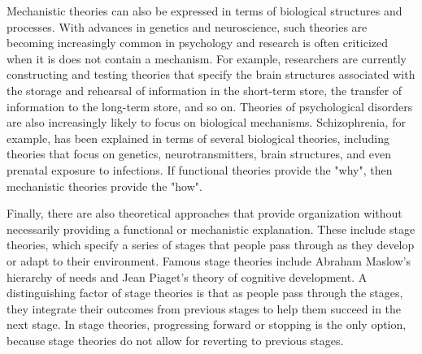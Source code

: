 Mechanistic theories can also be expressed in terms of biological structures and processes. With advances in genetics and neuroscience, such theories are becoming increasingly common in psychology and research is often criticized when it is does not contain a mechanism. For example, researchers are currently constructing and testing theories that specify the brain structures associated with the storage and rehearsal of information in the short-term store, the transfer of information to the long-term store, and so on. Theories of psychological disorders are also increasingly likely to focus on biological mechanisms. Schizophrenia, for example, has been explained in terms of several biological theories, including theories that focus on genetics, neurotransmitters, brain structures, and even prenatal exposure to infections. If functional theories provide the "why", then mechanistic theories provide the "how".

Finally, there are also theoretical approaches that provide organization without necessarily providing a functional or mechanistic explanation. These include stage theories, which specify a series of stages that people pass through as they develop or adapt to their environment. Famous stage theories include Abraham Maslow's hierarchy of needs and Jean Piaget's theory of cognitive development. A distinguishing factor of stage theories is
that as people pass through the stages, they integrate their outcomes from previous stages to help them succeed in the next stage. In stage theories, progressing forward or stopping is the only option, because stage theories do not allow for reverting to previous stages. 


